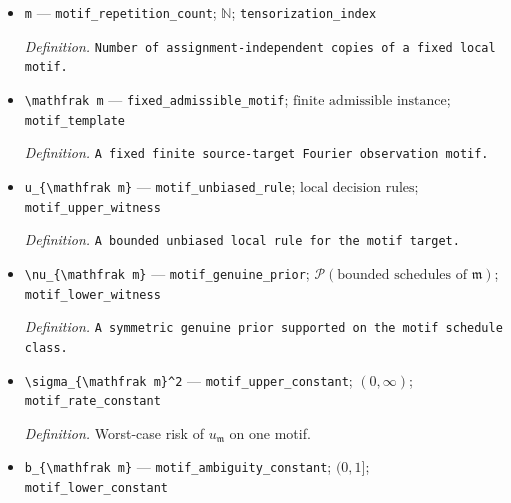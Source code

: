 \documentclass{article}
\begin{document}
\begin{itemize}
  \par\smallskip\noindent\emph{Definition.} The exact spectral-overlap degree \(D_n^{\mathrm{LE}}=\max_{i\in V_n}|\{j\in V_n\setminus\{i\}:\Gamma_i\cap\Gamma_j\ne\varnothing\}|\), constructed in \(\mathrm{def:loomba-eckles-spectral-envelope}\).
  \item \texttt{m} --- \texttt{motif\_\allowbreak{}repetition\_\allowbreak{}count}; \(\mathbb N\); \texttt{tensorization\_\allowbreak{}index}
  \par\smallskip\noindent\emph{Definition.} \texttt{Number of assignment-\allowbreak{}independent copies of a fixed local motif.}
  \item \texttt{\textbackslash{}\allowbreak{}mathfrak m} --- \texttt{fixed\_\allowbreak{}admissible\_\allowbreak{}motif}; \(\text{finite admissible instance}\); \texttt{motif\_\allowbreak{}template}
  \par\smallskip\noindent\emph{Definition.} \texttt{A fixed finite source-\allowbreak{}target Fourier observation motif.}
  \item \texttt{u\_\allowbreak{}\{\textbackslash{}\allowbreak{}mathfrak m\}\allowbreak{}} --- \texttt{motif\_\allowbreak{}unbiased\_\allowbreak{}rule}; \(\text{local decision rules}\); \texttt{motif\_\allowbreak{}upper\_\allowbreak{}witness}
  \par\smallskip\noindent\emph{Definition.} \texttt{A bounded unbiased local rule for the motif target.}
  \item \texttt{\textbackslash{}\allowbreak{}nu\_\allowbreak{}\{\textbackslash{}\allowbreak{}mathfrak m\}\allowbreak{}} --- \texttt{motif\_\allowbreak{}genuine\_\allowbreak{}prior}; \(\mathcal P(\text{bounded schedules of }\mathfrak m)\); \texttt{motif\_\allowbreak{}lower\_\allowbreak{}witness}
  \par\smallskip\noindent\emph{Definition.} \texttt{A symmetric genuine prior supported on the motif schedule class.}
  \item \texttt{\textbackslash{}\allowbreak{}sigma\_\allowbreak{}\{\textbackslash{}\allowbreak{}mathfrak m\}\allowbreak{}\textasciicircum{}2} --- \texttt{motif\_\allowbreak{}upper\_\allowbreak{}constant}; \((0,\infty)\); \texttt{motif\_\allowbreak{}rate\_\allowbreak{}constant}
  \par\smallskip\noindent\emph{Definition.} Worst-case risk of \(u_{\mathfrak m}\) on one motif.
  \item \texttt{b\_\allowbreak{}\{\textbackslash{}\allowbreak{}mathfrak m\}\allowbreak{}} --- \texttt{motif\_\allowbreak{}ambiguity\_\allowbreak{}constant}; \((0,1]\); \texttt{motif\_\allowbreak{}lower\_\allowbreak{}constant}

\end{itemize}
\end{document}

